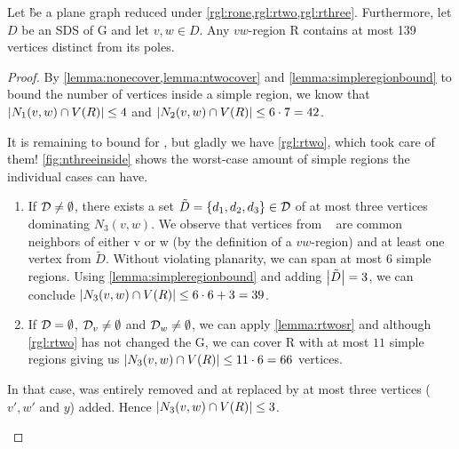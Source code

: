 \begin{lemma}\label{lemma:inside}
    Let \G be a plane graph reduced under \cref{rgl:rone,rgl:rtwo,rgl:rthree}. Furthermore, let $D$ be an SDS of G and let $v,w \in D$. Any $vw$-region R contains at most 139 vertices distinct from its poles.
\end{lemma}
\begin{proof} 
    By \cref{lemma:nonecover,lemma:ntwocover} and \cref{lemma:simpleregionbound} to bound the number of vertices inside a simple region, we know that $\abs{N_1(v,w) \cap V(R)} \leq 4$ and $\abs{N_2(v,w) \cap V(R)} \leq 6 \cdot 7 = 42$.
    
    It is remaining to bound for \nthi, but gladly we have \cref{rgl:rtwo}, which took care of them! \cref{fig:nthreeinside} shows the worst-case amount of simple regions the individual cases can have.
    
    \begin{caseofz}

        \begin{enumerate}
            \item If $\mathcal{D} \neq \emptyset$, there exists a set $\tilde D = \{d_1,d_2,d_3\} \in \mathcal{D}$ of at most three vertices dominating $N_3(v,w)$. We observe that vertices from \nthi~ are common neighbors of either v or w (by the definition of a $vw$-region) and at least one vertex from $\tilde D$. Without violating planarity, we can span at most 6 simple regions. Using \cref{lemma:simpleregionbound} and adding $\abs{\tilde D} = 3$, we can conclude $\abs{N_3(v,w) \cap V(R)} \leq 6 \cdot 6 + 3 = 39$.
            \item If $\mathcal{D} = \emptyset$, $\mathcal{D}_{v} \neq \emptyset$ and $\mathcal{D}_{w} \neq \emptyset$, we can apply \cref{lemma:rtwosr} and although \cref{rgl:rtwo} has not changed the G, we can cover R with at most $11$ simple regions giving us $\abs{N_3(v,w) \cap V(R)} \leq 11 \cdot 6 = 66$ vertices.
        \end{enumerate}
        
        In that case, \ntwi was entirely removed and at \nthi replaced by at most three vertices ($v', w'$ and $y$) added. Hence $\abs{N_3(v,w) \cap V(R)} \leq 3$.


\end{caseofz}
\end{proof}

